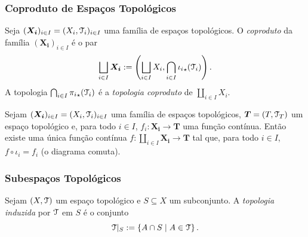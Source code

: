 \subsubsection{Coproduto de Espaços Topológicos}

\begin{defi}
Seja $(\bm{X_i})_{i \in I} = (X_i,\mathcal{T}_i)_{i \in I}$ uma família de espaços topológicos. O \emph{coproduto} da família $(\bm{X_i})_{i \in I}$ é o par
	\begin{equation*}
	\bigsqcup_{i \in I} \bm{X_i} := \left( \bigsqcup_{i \in I} X_i , \bigcap_{i \in I}{\iota_i}_\star(\mathcal{T}_i) \right).
	\end{equation*}
A topologia $\bigcap_{i \in I}{\pi_i}_\star(\mathcal{T}_i)$ é a \emph{topologia coproduto} de $\coprod_{i \in I} X_i$.
\end{defi}

\begin{prop}
Sejam $(\bm{X_i})_{i \in I} = (X_i,\mathcal{T}_i)_{i \in I}$ uma família de espaços topológicos, $\bm T = (T,\mathcal{T}_T)$ um espaço topológico e, para todo $i \in I$, $f_i: \bm{X_i} \to \bm T$ uma função contínua. Então existe uma única função contínua $f: \coprod_{i \in I} \bm{X_i} \to \bm T$ tal que, para todo $i \in I$, $f \circ \iota_i = f_i$ (o diagrama comuta).
\begin{figure}
\centering
{}
\end{figure}
\end{prop}

\subsubsection{Subespaços Topológicos}

\begin{defi}
Sejam $(X,\mathcal{T})$ um espaço topológico e $S \subseteq X$ um subconjunto. A \emph{topologia induzida} por $\mathcal{T}$ em $S$ é o conjunto
	\begin{equation*}
	\mathcal{T}|_S := \left\{A \cap S \;\middle\vert\; A \in \mathcal{T} \right\}.
	\end{equation*}
\end{defi}

